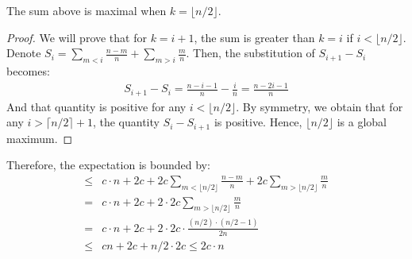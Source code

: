 \begin{claim}
  The sum above is maximal when $k = \lfloor n/2 \rfloor $. 
\end{claim}
\begin{proof}
  We will prove that for $k=i+1$, the sum is greater than $k=i$ if $i<\lfloor n/2 \rfloor$. Denote $S_{i} =\sum_{m < i}{ \frac{n-m}{n} }  + \sum_{m > i}{ \frac{m}{n}}$. Then, the substitution of $S_{i+1} - S_{i}$ becomes:
  \begin{equation*}
    \begin{split}
      S_{i+1} - S_{i} = \frac{n-i - 1}{n} - \frac{i}{n} = \frac{n-2i-1}{n}
    \end{split}
  \end{equation*}
  And that quantity is positive for any $i < \lfloor n/2 \rfloor$. By symmetry, we obtain that for any $i > \lceil n/2 \rceil + 1$, the quantity $S_i - S_{i+1}$ is positive. Hence, $\lfloor n/2 \rfloor$ is a global maximum.
\end{proof}
Therefore, the expectation is bounded by:
\begin{equation*}
  \begin{split}
    \le & c\cdot n + 2c +  2c \sum_{m < \lfloor n/2 \rfloor }{ \frac{n-m}{n} }  + 2c\sum_{m > \lfloor n/2 \rfloor }{ \frac{m}{n}} \\ 
    = &  c\cdot n + 2c +  2 \cdot  2c\sum_{m > \lfloor n/2 \rfloor }{ \frac{m}{n}} \\ 
    = &  c\cdot n + 2c +  2 \cdot  2c \cdot \frac{  (n/2) \cdot (n/2 - 1)  }{2n} \\ 
    \le & cn + 2c + n/2 \cdot 2c  \le 2c \cdot n
  \end{split}
\end{equation*}

